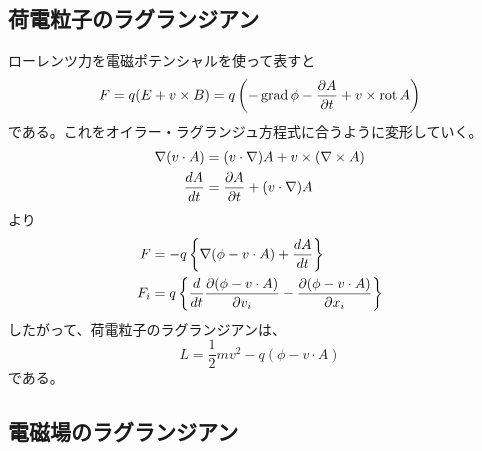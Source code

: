 \subsection{荷電粒子のラグランジアン}
    ローレンツ力を電磁ポテンシャルを使って表すと
        \[F = q(E + v \times B) = q\left(-\grad\phi - \pd[A]{t} + v \times \rot A\right)\]
    である。これをオイラー・ラグランジュ方程式に合うように変形していく。
    \begin{align*}
        \nabla(v \cdot A) &= (v \cdot \nabla)A + v \times (\nabla \times A)\\
        \de[A]{t} &= \pd[A]{t} + (v \cdot \nabla)A
    \end{align*}
    より
    \begin{align*}
        F &= -q \mlr{\nabla(\phi - v\cdot A) + \de[A]{t}}\\
        F_i &= q\mlr{\de{t}\pd[(\phi - v\cdot A)]{v_i} - \pd[(\phi - v\cdot A)]{x_i}}
    \end{align*}
    したがって、荷電粒子のラグランジアンは、
        \[L = \frac{1}{2}mv^2 - q(\phi - v\cdot A)\]
    である。

\subsection{電磁場のラグランジアン}